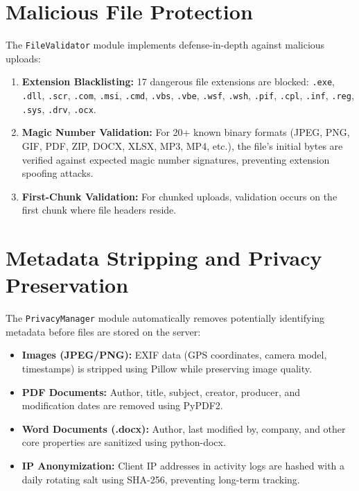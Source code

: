 \section{Malicious File Protection}

The \texttt{FileValidator} module implements defense-in-depth against malicious uploads:

\begin{enumerate}
    \item \textbf{Extension Blacklisting:} 17 dangerous file extensions are blocked: \texttt{.exe}, \texttt{.dll}, \texttt{.scr}, \texttt{.com}, \texttt{.msi}, \texttt{.cmd}, \texttt{.vbs}, \texttt{.vbe}, \texttt{.wsf}, \texttt{.wsh}, \texttt{.pif}, \texttt{.cpl}, \texttt{.inf}, \texttt{.reg}, \texttt{.sys}, \texttt{.drv}, \texttt{.ocx}.
    
    \item \textbf{Magic Number Validation:} For 20+ known binary formats (JPEG, PNG, GIF, PDF, ZIP, DOCX, XLSX, MP3, MP4, etc.), the file's initial bytes are verified against expected magic number signatures, preventing extension spoofing attacks.
    
    \item \textbf{First-Chunk Validation:} For chunked uploads, validation occurs on the first chunk where file headers reside.
\end{enumerate}

\section{Metadata Stripping and Privacy Preservation}

The \texttt{PrivacyManager} module automatically removes potentially identifying metadata before files are stored on the server:

\begin{itemize}
    \item \textbf{Images (JPEG/PNG):} EXIF data (GPS coordinates, camera model, timestamps) is stripped using Pillow while preserving image quality.
    \item \textbf{PDF Documents:} Author, title, subject, creator, producer, and modification dates are removed using PyPDF2.
    \item \textbf{Word Documents (.docx):} Author, last modified by, company, and other core properties are sanitized using python-docx.
    \item \textbf{IP Anonymization:} Client IP addresses in activity logs are hashed with a daily rotating salt using SHA-256, preventing long-term tracking.
\end{itemize}

